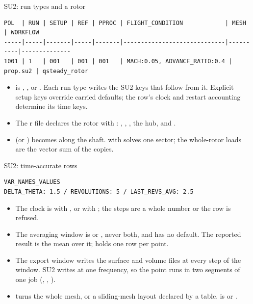 \begin{frame}[fragile]{SU2: run types and a rotor}
\begin{lstlisting}
POL  | RUN | SETUP | REF | PPROC | FLIGHT_CONDITION            | MESH     | WORKFLOW
-----|-----|-------|-----|-------|-----------------------------|----------|--------------
1001 | 1   | 001   | 001 | 001   | MACH:0.05, ADVANCE_RATIO:0.4 | prop.su2 | qsteady_rotor
\end{lstlisting}
\begin{itemize}\small
  \item {} is , ,
         or . Each run type writes the SU2
        keys that follow from it. Explicit setup keys override carried
        defaults; the row's clock and restart accounting determine its time keys.
  \item The r file declares the rotor with :
        , , , the hub,
         and .
  \item {} (or ) becomes 
        along the shaft.   with
         solves one sector; the whole-rotor loads are
        the vector sum of the copies.
\end{itemize}
\end{frame}

\begin{frame}[fragile]{SU2: time-accurate rows}
\begin{lstlisting}
VAR_NAMES_VALUES
DELTA_THETA: 1.5 / REVOLUTIONS: 5 / LAST_REVS_AVG: 2.5
\end{lstlisting}
\begin{itemize}\small
  \item The clock is  with , or
         with ; the steps are a whole
        number or the row is refused.
  \item The averaging window is  or
        , never both, and has no default. The reported
        result is the mean over it; 
        holds one row per point.
  \item The export window writes the surface and volume files at every step
        of the window. SU2 writes at one frequency, so the point runs in two
        segments of one job (, ,
        ).
  \item {} turns the whole mesh, or a sliding-mesh layout
        declared by a \code{[sliding]} table.  is
         or .
\end{itemize}
\end{frame}

